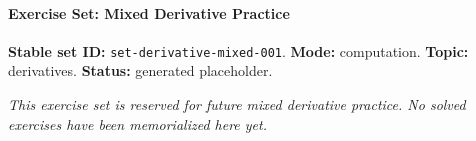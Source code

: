 
\paragraph{Exercise Set: Mixed Derivative Practice}
\textbf{Stable set ID:} \texttt{set-derivative-mixed-001}.
\textbf{Mode:} computation.
\textbf{Topic:} derivatives.
\textbf{Status:} generated placeholder.

\textit{This exercise set is reserved for future mixed derivative practice.
No solved exercises have been memorialized here yet.}
